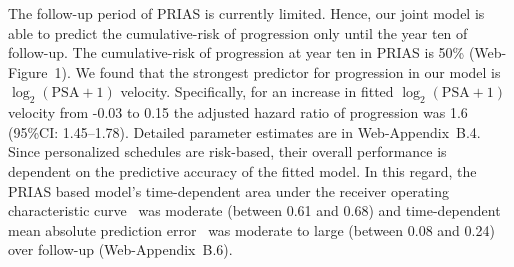 The follow-up period of PRIAS is currently limited. Hence, our joint model is able to predict the cumulative-risk of progression only until the year ten of follow-up. The cumulative-risk of progression at year ten in PRIAS is 50\% (Web-Figure~1). We found that the strongest predictor for progression in our model is $\log_2(\mbox{PSA} + 1)$ velocity. Specifically, for an increase in fitted $\log_2(\mbox{PSA} + 1)$ velocity from -0.03 to 0.15 the adjusted hazard ratio of progression was 1.6 (95\%CI: 1.45--1.78). Detailed parameter estimates are in Web-Appendix~B.4. Since personalized schedules are risk-based, their overall performance is dependent on the predictive accuracy of the fitted model. In this regard, the PRIAS based model's time-dependent area under the receiver operating characteristic curve~\citep{rizopoulos2011dynamic} was moderate (between 0.61 and 0.68) and time-dependent mean absolute prediction error~\citep{rizopoulos2011dynamic} was moderate to large (between 0.08 and 0.24) over follow-up (Web-Appendix~B.6).

